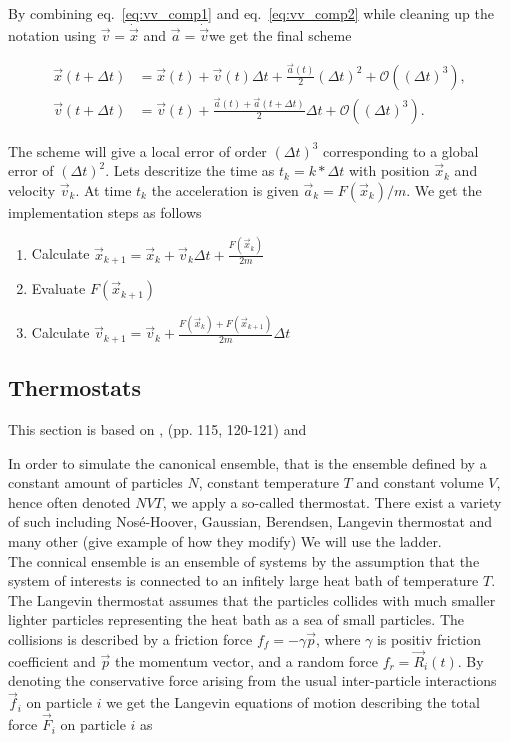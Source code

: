 By combining eq.~\eqref{eq:vv_comp1} and eq.~\eqref{eq:vv_comp2} while cleaning up the notation using $\vec{v} = \dot{\vec{x}}$ and $\vec{a} = \dot{\vec{v}} $we get the final scheme

\begin{align*}
  \vec{x}(t + \Delta t) &= \vec{x}(t) + \vec{v}(t) \Delta t + \frac{\vec{a}(t)}{2}(\Delta t)^2 + \mathcal{O}((\Delta t)^3), \\
  \vec{v}(t+\Delta t)  &= \vec{v}(t) + \frac{\vec{a}(t) + \vec{a}(t+\Delta t)}{2}  \Delta t + \mathcal{O}((\Delta t)^3).
\end{align*}

The scheme will give a local error of order $(\Delta t)^3$ corresponding to a global error of $(\Delta t)^2$. Lets descritize the time as $t_k = k * \Delta t$ with position $\vec{x}_k$ and velocity $\vec{v}_k$. At time $t_k$ the acceleration is given $\vec{a}_k = F(\vec{x}_k)/m$. We get the implementation steps as follows
\begin{enumerate}
  \item Calculate $\vec{x}_{k+1} = \vec{x}_k + \vec{v}_k \Delta t + \frac{F(\vec{x}_k)}{2m}$
  \item Evaluate $F(\vec{x}_{k+1})$
  \item Calculate $\vec{v}_{k+1} = \vec{v}_k + \frac{F(\vec{x}_k) + F(\vec{x}_{k+1})}{2m} \Delta t$
\end{enumerate}



\subsection{Thermostats}
This section is based on \cite{PhysRevB.17.1302}, \cite{Hunenberger2005}(pp. 115, 120-121) and \cite{docs_lammps_langevin}

In order to simulate the canonical ensemble, that is the ensemble defined by a constant amount of particles $N$, constant temperature $T$ and constant volume $V$, hence often denoted $NVT$, we apply a so-called thermostat. There exist a variety of such including Nosé-Hoover, Gaussian, Berendsen, Langevin thermostat and many other (give example of how they modify) We will use the ladder. \\
The connical ensemble is an ensemble of systems by the assumption that the system of interests is connected to an infitely large heat bath of temperature $T$. The Langevin thermostat assumes that the particles collides with much smaller lighter particles representing the heat bath as a sea of small particles. The collisions is described by a friction force $f_f = -\gamma \vec{p}$, where $\gamma$ is positiv friction coefficient and $\vec{p}$ the momentum vector, and a random force $f_r = \vec{R}_i(t)$. By denoting the conservative force arising from the usual inter-particle interactions $\vec{f}_i$ on particle $i$ we get the Langevin equations of motion describing the total force $\vec{F}_i$ on particle $i$ as

